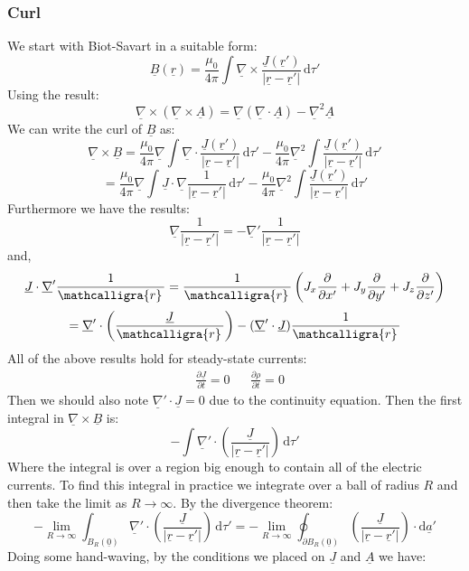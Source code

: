 \documentclass[12pt]{article}
\newcommand{\pf}[2]{\frac{\partial #1}{\partial #2}}
\newcommand{\dive}[1]{\underline{\nabla}\cdot\underline{#1}}
\newcommand{\curl}[1]{\underline{\nabla}\times \underline{#1}}
\newcommand{\scriptr}{\ensuremath{\mathcalligra{r}}\,}
\begin{document}
\subsubsection{Curl}
We start with Biot-Savart in a suitable form:
\[\underline{B}(\underline{r})=\frac{\mu_0}{4\pi}\int\underline{\nabla}\times\frac{\underline{J}(\underline{r}')}{|\underline{r}-\underline{r}'|}\,\text{d}\tau'\]
Using the result:
\[\underline{\nabla}\times(\curl{A})=\underline{\nabla}(\dive{A})-\underline{\nabla}^2\underline{A}\]
We can write the curl of \(\underline{B}\) as:
\[\curl{B}=\frac{\mu_0}{4\pi}\underline{\nabla}\int\underline{\nabla}\cdot\frac{\underline{J}(\underline{r}')}{|\underline{r}-\underline{r}'|}\,\text{d}\tau'-\frac{\mu_0}{4\pi}\underline{\nabla}^2\int\frac{\underline{J}(\underline{r}')}{|\underline{r}-\underline{r}'|}\,\text{d}\tau'\]
\[=\frac{\mu_0}{4\pi}\underline{\nabla}\int \underline{J}\cdot\underline{\nabla}\frac{1}{|\underline{r}-\underline{r}'|}\,\text{d}\tau'-\frac{\mu_0}{4\pi}\underline{\nabla}^2\int\frac{\underline{J}(\underline{r}')}{|\underline{r}-\underline{r}'|}\,\text{d}\tau'\]
Furthermore we have the results:
\[\underline{\nabla}\frac{1}{|\underline{r}-\underline{r}'|}=-\underline{\nabla}'\frac{1}{|\underline{r}-\underline{r}'|}\]
and,
\[\underline{J}\cdot\underline{\nabla}'\frac{1}{\scriptr}=\frac{1}{\scriptr}\left(J_x\pf{}{x'}+J_y\pf{}{y'}+J_z\pf{}{z'}\right)\]
\[=\underline{\nabla}'\cdot\left(\frac{\underline{J}}{\scriptr}\right)-(\underline{\nabla}'\cdot\underline{J})\frac{1}{\scriptr}\]
All of the above results hold for steady-state currents:
\begin{align*}
    &\pf{\underline{J}}{t}=0 && \pf{\rho}{t}=0
\end{align*}
Then we should also note \(\underline{\nabla}'\cdot\underline{J}=0\) due to the continuity equation. Then the first integral in \(\curl{B}\) is:
\[-\int\underline{\nabla}'\cdot\left(\frac{\underline{J}}{|\underline{r}-\underline{r}'|}\right)\,\text{d}\tau'\]
Where the integral is over a region big enough to contain all of the electric currents. To find this integral in practice we integrate over a ball of radius \(R\) and then take the limit as \(R\to\infty\). By the divergence theorem:
\[-\lim_{R\to\infty}\int_{B_R(\underline{0})}\underline{\nabla}'\cdot\left(\frac{\underline{J}}{|\underline{r}-\underline{r}'|}\right)\,\text{d}\tau'=-\lim_{R\to\infty}\oint_{\partial B_R(\underline{0})}\left(\frac{\underline{J}}{|\underline{r}-\underline{r}'|}\right)\cdot\text{d}\underline{a}'\]
Doing some hand-waving, by the conditions we placed on \(\underline{J}\) and \(\underline{A}\) we have:
\end{document}
